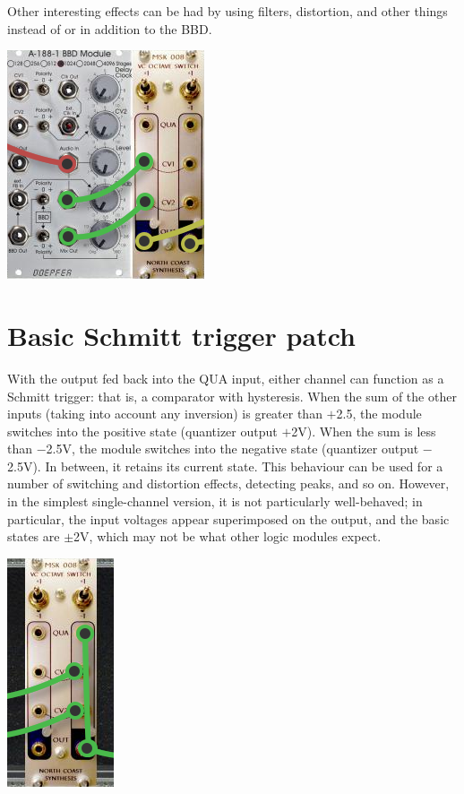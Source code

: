 Other interesting effects can be had by using filters, distortion, and other
things instead of or in addition to the BBD.

{\hspace*{\fill}\includegraphics[scale=0.8]{patch5.png}\hspace*{\fill}\par} 

\section{Basic Schmitt trigger patch}

With the output fed back into the QUA input, either channel can function as
a Schmitt trigger: that is, a comparator with hysteresis.  When the sum of
the other inputs (taking into account any inversion) is greater than $+$2.5,
the module switches into the positive state (quantizer output $+$2V).  When
the sum is less than $-$2.5V, the module switches into the negative state
(quantizer output $-$2.5V).  In between, it retains its current state.  This
behaviour can be used for a number of switching and distortion effects,
detecting peaks, and so on.  However, in the simplest single-channel
version, it is not particularly well-behaved; in particular, the input
voltages appear superimposed on the output, and the basic states are
$\pm$2V, which may not be what other logic modules expect.

{\hspace*{\fill}\includegraphics[scale=0.8]{patch7.png}\hspace*{\fill}\par} 

